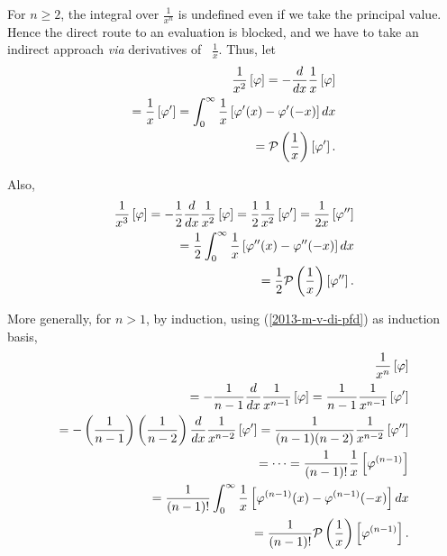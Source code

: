 For $n\ge 2$, the integral over $\frac{1}{x^n}$ is undefined even if we take the principal value.
Hence the direct route to an evaluation is blocked, and we have to take an indirect approach {\it via}
derivatives of~\cite{sommer-di} $\frac{1}{x}$.
Thus, let
\begin{equation}
\begin{split}
\frac{1}{x^2} \left[ \varphi \right]
=
-\frac{d}{dx} \frac{1}{x} \left[ \varphi \right] \\
=\frac{1}{x} \left[ \varphi ' \right] =
\int_0^{\infty}  \frac{1}{x}  \left[  \varphi'(x)
-
   \varphi'(-x) \right] dx
\\
 =
{\cal P} \left(\frac{1}{x}\right) \left[\varphi ' \right]
 .
\end{split}
\label{2013-m-v-di-pfd}
\end{equation}

Also,
\begin{equation}
\begin{split}
\frac{1}{x^3} \left[ \varphi \right]
=
-\frac{1}{2}\frac{d}{dx} \frac{1}{x^2} \left[ \varphi \right]
=\frac{1}{2}\frac{1}{x^2} \left[ \varphi ' \right] =  \frac{1}{2x} \left[ \varphi '' \right]\\
=
\frac{1}{2} \int_0^{\infty}  \frac{1}{x}  \left[  \varphi''(x)
-
   \varphi''(-x) \right] dx
\\
 =
\frac{1}{2} {\cal P} \left(\frac{1}{x}\right) \left[\varphi '' \right]
 .
\label{2013-m-v-di-pfd3}
\end{split}
\end{equation}


More generally, for $n>1$, by induction, using (\ref{2013-m-v-di-pfd}) as induction basis,
\begin{equation}
\begin{split}
\frac{1}{x^n} \left[ \varphi \right]  \\
=
-\frac{1}{n-1}\frac{d}{dx} \frac{1}{x^{n-1}} \left[ \varphi \right]
=
 \frac{1}{n-1}  \frac{1}{x^{n-1}} \left[ \varphi' \right]  \\
=
-\left( \frac{1}{n-1} \right) \left(\frac{1}{n-2}\right) \frac{d}{dx} \frac{1}{x^{n-2}} \left[ \varphi' \right]
=
 \frac{1}{(n-1)(n-2)}   \frac{1}{x^{n-2}} \left[ \varphi'' \right]  \\
=   \cdots =
\frac{1}{(n-1)!} \frac{1}{x} \left[ \varphi^{({n-1})} \right]  \\
=\frac{1}{(n-1)!}
\int_0^{\infty}  \frac{1}{x}  \left[  \varphi^{(n-1)}(x)
-
   \varphi^{(n-1)}(-x) \right] dx
\\
 =
\frac{1}{(n-1)!} {\cal P} \left(\frac{1}{x}\right) \left[\varphi^{(n-1)} \right]
 .
\end{split}
\end{equation}




